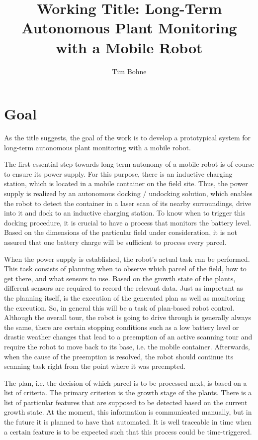 \documentclass[german, master, expose, latin1]{base/thesis_KBS}
\begin{document}
\title{Working Title: Long-Term Autonomous Plant Monitoring with a Mobile Robot}
\author{Tim Bohne}

\generatetitle

\section{Goal}

As the title suggests, the goal of the work is to develop a prototypical system for long-term autonomous plant monitoring with a mobile robot.\newline

The first essential step towards long-term autonomy of a mobile robot is of course to ensure its power supply.
For this purpose, there is an inductive charging station, which is located in a mobile container on the field site.
Thus, the power supply is realized by an autonomous docking / undocking solution, which enables the robot to detect the container in a laser scan
of its nearby surroundings, drive into it and dock to an inductive charging station. To know when to trigger this docking procedure, it is crucial 
to have a process that monitors the battery level. Based on the dimensions of the particular field under consideration, it is not assured that one battery 
charge will be sufficient to process every parcel.\newline

When the power supply is established, the robot's actual task can be performed. This task consists of planning when to observe which parcel of the field,
how to get there, and what sensors to use. Based on the growth state of the plants, different sensors are required to record the relevant data.
Just as important as the planning itself, is the execution of the generated plan as well as monitoring the execution.
So, in general this will be a task of plan-based robot control.
Although the overall tour, the robot is going to drive through is generally always the same, there are certain stopping conditions 
such as a low battery level or drastic weather changes that lead to a preemption of an active scanning tour and require the robot 
to move back to its base, i.e. the mobile container. Afterwards, when the cause of the preemption is resolved, 
the robot should continue its scanning task right from the point where it was preempted.\newline

The plan, i.e. the decision of which parcel is to be processed next, is based on a list of criteria. The primary criterion is the growth stage of the plants.
There is a list of particular features that are supposed to be detected based on the current growth state.
At the moment, this information is communicated manually, but in the future it is planned to have that automated.
It is well traceable in time when a certain feature is to be expected such that this process could be time-triggered.\newline
\end{document}
